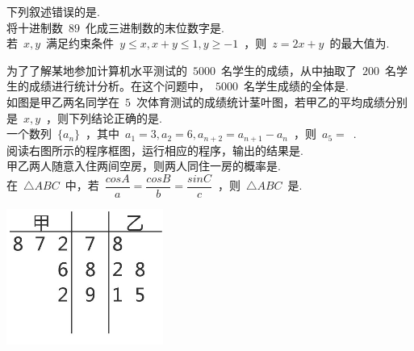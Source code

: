 \documentclass{BHCexam}
\begin{document}
\maketitle

\begin{questions}

\xuanze
\question 下列叙述错误的是.\\
\qs 将十进制数~$89$~化成三进制数的末位数字是.\\
\question 若~$x,y$~满足约束条件~$y\leq x,x+y\leq 1,y\geq -1$~，则~$z=2x+y$~的最大值为.\\
\begin{minipage}[b]{0.8\linewidth}
\question 为了了解某地参加计算机水平测试的~$5000$~名学生的成绩，从中抽取了~$200$~名学生的成绩进行统计分析。在这个问题中，~$5000$~名学生成绩的全体是.\\
\question 如图是甲乙两名同学在~$5$~次体育测试的成绩统计茎叶图，若甲乙的平均成绩分别是~$x,y$~，则下列结论正确的是.\\
\question 一个数列~$\{a_n \}$~，其中~$a_1=3,a_2=6,a_{n+2}=a_{n+1}-a_n$~，则~$a_5=$~.\\
\question  阅读右图所示的程序框图，运行相应的程序，输出的结果是.\\
\qs 甲乙两人随意入住两间空房，则两人同住一房的概率是.\\
\qs 在~$\triangle ABC$~中，若~$\dfrac{cosA}{a}=\dfrac{cosB}{b}=\dfrac{sinC}{c}$~，则~$\triangle ABC$~是.\\
\end{minipage}
\begin{minipage}[b]{0.2\linewidth}
\begin{flushright}
\includegraphics[scale=0.6]{456.png}

\end{flushright}
\end{minipage}
\end{questions}
\end{document}
